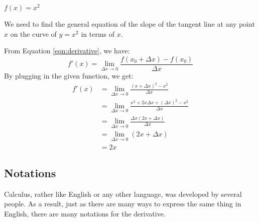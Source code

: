 \documentclass[../main.tex]{subfiles}
\begin{document}
\begin{exmp}
    $f(x) = x^2$

    We need to find the general equation of the slope of the tangent line 
    at any point $x$ on the curve of $y=x^2$ in terms of $x$.

    From Equation \ref{eqn:derivative}, we have:
    \begin{equation*}
        f'(x) = \lim_{\Delta x \to 0}
                    \frac
                    {
                        f \left( x_0 + \Delta x \right)
                        - f \left( x_0 \right)
                    }
                    {\Delta x}
    \end{equation*}
    By plugging in the given function, we get:
    \begin{equation*}
        \begin{split}
            f'(x)   & = \lim_{\Delta x \to 0}
                            \frac
                            {\left( x + \Delta x \right)^2 - x^2}
                            {\Delta x}\\
                    & = \lim_{\Delta x \to 0}
                            \frac
                            {
                                x^2 +
                                2x \Delta x +
                                \left( \Delta x \right)^2 -
                                x^2
                            }
                            {\Delta x}\\
                    & = \lim_{\Delta x \to 0}
                            \frac
                            {\Delta x \left( 2x + \Delta x \right)}
                            {\Delta x}\\
                    & = \lim_{\Delta x \to 0} \left( 2x + \Delta x \right)\\
                    & = 2x
        \end{split}
    \label{eg:derivative}
    \end{equation*}
\end{exmp}
\subsection*{Notations}
Calculus, rather like English or any other language, 
was developed by several people. As a result, just as there are many ways 
to express the same thing in English, there are many notations for 
the derivative.
\end{document}
